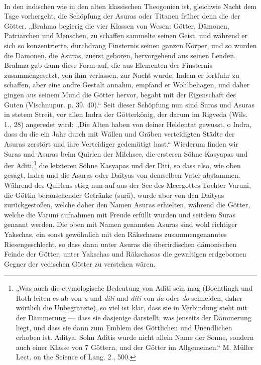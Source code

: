 \documentclass{article}
\begin{document}
\paragraph{}
In den indischen wie in den alten klassischen Theogonien ist, gleichwie Nacht dem Tage vorhergeht, die Schöpfung der Asuras oder Titanen früher denn die der Götter. „Brahma begierig die vier Klassen von Wesen: Götter, Dämonen, Patriarchen und Menschen, zu schaffen sammelte seinen Geist, und während er sich so konzentrierte, durchdrang Finsternis seinen ganzen Körper, und so wurden die Dämonen, die Asuras, zuerst geboren, hervorgehend aus seinen Lenden. Brahma gab dann diese Form auf, die aus Elementen der Finsternis zusammengesetzt, von ihm verlassen, zur Nacht wurde. Indem er fortfuhr zu schaffen, aber eine andre Gestalt annahm, empfand er Wohlbehagen, und daher gingen aus seinem Mund die Götter hervor, begabt mit der Eigenschaft des Guten (Vischnupur. p. 39. 40).“ Seit dieser Schöpfung nun sind Suras und Asuras in stetem Streit, vor allen Indra der Götterkönig, der darum im Rigveda (Wils. 1., 28) angeredet wird: „Die Alten haben von deiner Heldentat gewusst, o Indra, dass du die ein Jahr durch mit Wällen und Gräben verteidigten Städte der Asuras zerstört und ihre Verteidiger gedemütigt hast.“ Wiederum finden wir Suras und Asuras beim Quirlen der Milchsee, die ersteren Söhne Kasyapas und der Aditi,\footnote{„Was auch die etymologische Bedeutung von Aditi sein mag (Boehtlingk und Roth leiten es ab von \emph{a} und \emph{diti} und \emph{diti} von \emph{da} oder \emph{do} schneiden, daher wörtlich die Unbegränzte), so viel ist klar, dass sie in Verbindung steht mit der Dämmerung — dass sie dasjenige darstellt, was jenseits der Dämmerung liegt, und dass sie dann zum Emblem des Göttlichen und Unendlichen erhoben ist. Aditya, Sohn Aditis wurde nicht allein Name der Sonne, sondern auch einer Klasse von 7 Göttern, und der Götter im Allgemeinen.“ M. Müller Lect. on the Science of Lang. 2., 500.} die letzteren Söhne Kasyapas und der Diti, so dass also, wie oben gesagt, Indra und die Asuras oder Daityas von demselben Vater abstammen. Während des Quirlens stieg nun auf aus der See des Meergottes Tochter Varuni, die Göttin berauschender Getränke (sur\={a}), wurde aber von den Daityas zurückgestoßen, welche daher den Namen Asuras erhielten, während die Götter, welche die Varuni aufnahmen mit Freude erfüllt wurden und seitdem Suras genannt werden. Die oben mit Namen genannten Asuras sind wohl richtiger Yakschas, ein sonst gewöhnlich mit den R\={a}kschasas zusammengenanntes Riesengeschlecht, so dass dann unter Asuras die überirdischen dämonischen Feinde der Götter, unter Yakschas und R\={a}kschasas die gewaltigen erdgebornen Gegner der vedischen Götter zu verstehen wären.
\end{document}
